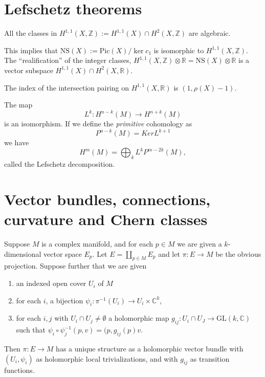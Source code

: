 \documentclass{book}
\begin{document}
\section{Lefschetz theorems}
\label{section-lefschetz-theorems}

\begin{theorem}
\label{theorem-11-classes}
All the classes in $H^{1,1}(X,\mathbb{Z})
:=H^{1,1}(X) \cap H^2(X,\mathbb{Z})$ are
algebraic.
\end{theorem}

\noindent
This implies that
$\text{NS}(X):=\text{Pic}(X)/\ker c_1$
is isomorphic to $H^{1,1}(X,\mathbb{Z})$.
The ``realification'' of the integer classes,
$H^{1,1}(X,\mathbb{Z}) \otimes \mathbb{R}
=\text{NS}(X) \otimes \mathbb{R}$
is a vector subspace
$H^{1,1}(X) \cap H^2(X,\mathbb{R})$.

\begin{theorem}
\label{theorem-hodge-index}
The index of the intersection pairing on
$H^{1,1}(X,\mathbb{R})$
is $(1,\rho(X)-1)$.
\end{theorem}

\begin{theorem}
\label{theorem-hard-lefschetz}
\begin{reference}
\cite[p. 122]{gri}
\end{reference}
The map
$$
L^k:H^{n-k}(M) \to H^{n+k}(M)
$$
is an isomorphism.
If we define the {\it primitive} cohomology
as
$$
P^{n-k}(M) = Ker L^{k+1}
$$
we have
$$
H^m(M)=\bigoplus_k L^kP^{m-2k}(M),
$$
called the Lefschetz decomposition.
\end{theorem}

\section{Vector bundles, connections,
curvature and Chern classes}
\label{section-vector-bundles}

\begin{lemma}
\label{lemma-vector-bundle-from-fibers}
\begin{reference}
\cite[Lemma 3.4]{lec}
\end{reference}
Suppose $M$ is a complex manifold,
and for each $p \in M$ we are given a
$k$-dimensional vector space $E_p$.
Let $E=\coprod_{p \in M}E_p$ and let $\pi:E
\to M$ be the obvious projection.
Suppose further that we are given
\begin{enumerate}
\item an indexed open cover $U_i$ of $M$
\item for each $i$, a bijection $
\psi_i:\pi^{-1}(U_i) \to U_i
\times\mathbb{C}^k$,
\item for each $i,j$ with $U_i\cap U_j \neq
\emptyset$
a holomorphic map $g_{ij}:U_i \cap U_J \to
\text{GL}(k,\mathbb{C})$
such that $\psi_i\circ
\psi_j^{-1}(p,v)=(p,g_{ij}(p)v$.
\end{enumerate}
\noindent
Then $\pi:E \to M$ has a unique structure as
a holomorphic vector bundle
with $(U_i,\psi_i)$ as holomorphic local
trivializations,
and with $g_{ij}$ as transition functions.
\end{lemma}
\end{document}
